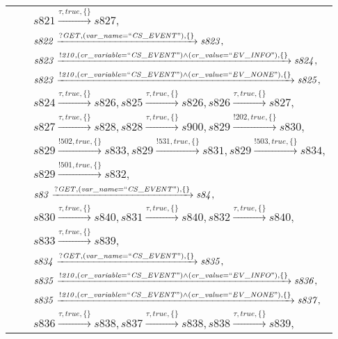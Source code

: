 \begin{tabular}{lcp{350px}}
& & $\mathit{s821}\xrightarrow{\mathit{\tau}, \mathit{true}, \{\}}\mathit{s827},$ \\
& & $\mathit{s822}\xrightarrow{\mathit{?GET}, \mathit{(var\_name = ``CS\_EVENT")}, \{\}}\mathit{s823},$ \\
& & $\mathit{s823}\xrightarrow{\mathit{!210}, \mathit{(cr\_variable = ``CS\_EVENT") \land (cr\_value = ``EV\_INFO")}, \{\}}\mathit{s824},$ \\
& & $\mathit{s823}\xrightarrow{\mathit{!210}, \mathit{(cr\_variable = ``CS\_EVENT") \land (cr\_value = ``EV\_NONE")}, \{\}}\mathit{s825},$ \\
& & $\mathit{s824}\xrightarrow{\mathit{\tau}, \mathit{true}, \{\}}\mathit{s826},\mathit{s825}\xrightarrow{\mathit{\tau}, \mathit{true}, \{\}}\mathit{s826},\mathit{s826}\xrightarrow{\mathit{\tau}, \mathit{true}, \{\}}\mathit{s827},$ \\
& & $\mathit{s827}\xrightarrow{\mathit{\tau}, \mathit{true}, \{\}}\mathit{s828},\mathit{s828}\xrightarrow{\mathit{\tau}, \mathit{true}, \{\}}\mathit{s900},\mathit{s829}\xrightarrow{\mathit{!202}, \mathit{true}, \{\}}\mathit{s830},$ \\
& & $\mathit{s829}\xrightarrow{\mathit{!502}, \mathit{true}, \{\}}\mathit{s833},\mathit{s829}\xrightarrow{\mathit{!531}, \mathit{true}, \{\}}\mathit{s831},\mathit{s829}\xrightarrow{\mathit{!503}, \mathit{true}, \{\}}\mathit{s834},$ \\
& & $\mathit{s829}\xrightarrow{\mathit{!501}, \mathit{true}, \{\}}\mathit{s832},$ \\
& & $\mathit{s83}\xrightarrow{\mathit{?GET}, \mathit{(var\_name = ``CS\_EVENT")}, \{\}}\mathit{s84},$ \\
& & $\mathit{s830}\xrightarrow{\mathit{\tau}, \mathit{true}, \{\}}\mathit{s840},\mathit{s831}\xrightarrow{\mathit{\tau}, \mathit{true}, \{\}}\mathit{s840},\mathit{s832}\xrightarrow{\mathit{\tau}, \mathit{true}, \{\}}\mathit{s840},$ \\
& & $\mathit{s833}\xrightarrow{\mathit{\tau}, \mathit{true}, \{\}}\mathit{s839},$ \\
& & $\mathit{s834}\xrightarrow{\mathit{?GET}, \mathit{(var\_name = ``CS\_EVENT")}, \{\}}\mathit{s835},$ \\
& & $\mathit{s835}\xrightarrow{\mathit{!210}, \mathit{(cr\_variable = ``CS\_EVENT") \land (cr\_value = ``EV\_INFO")}, \{\}}\mathit{s836},$ \\
& & $\mathit{s835}\xrightarrow{\mathit{!210}, \mathit{(cr\_variable = ``CS\_EVENT") \land (cr\_value = ``EV\_NONE")}, \{\}}\mathit{s837},$ \\
& & $\mathit{s836}\xrightarrow{\mathit{\tau}, \mathit{true}, \{\}}\mathit{s838},\mathit{s837}\xrightarrow{\mathit{\tau}, \mathit{true}, \{\}}\mathit{s838},\mathit{s838}\xrightarrow{\mathit{\tau}, \mathit{true}, \{\}}\mathit{s839},$ \\
\end{tabular}

